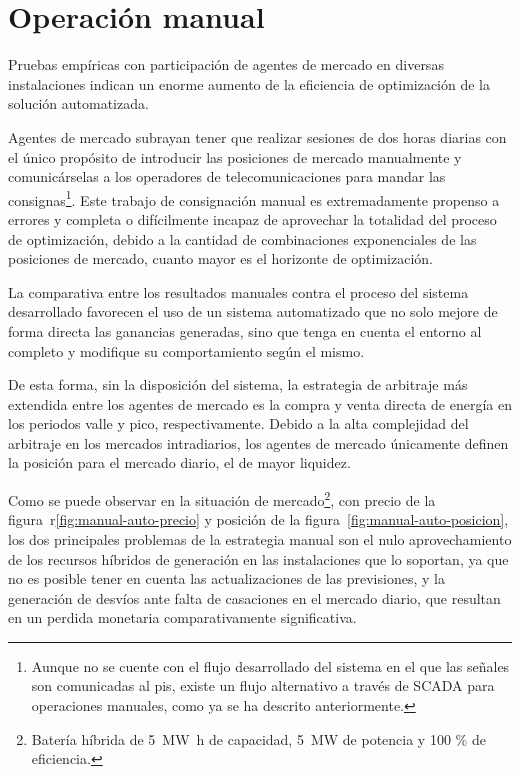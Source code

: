 \section{Operación manual}
\label{makereference7.2}

Pruebas empíricas con participación de agentes de mercado en diversas instalaciones indican un enorme aumento de la eficiencia de optimización de la solución automatizada.

Agentes de mercado subrayan tener que realizar sesiones de dos horas diarias con el único propósito de introducir las posiciones de mercado manualmente y comunicárselas a los operadores de telecomunicaciones para mandar las consignas\footnote{Aunque no se cuente con el flujo desarrollado del sistema en el que las señales son comunicadas al \gls{pis}, existe un flujo alternativo a través de SCADA para operaciones manuales, como ya se ha descrito anteriormente.}. Este trabajo de consignación manual es extremadamente propenso a errores y completa o difícilmente incapaz de aprovechar la totalidad del proceso de optimización, debido a la cantidad de combinaciones exponenciales de las posiciones de mercado, cuanto mayor es el horizonte de optimización.

La comparativa entre los resultados manuales contra el proceso del sistema desarrollado favorecen el uso de un sistema automatizado que no solo mejore de forma directa las ganancias generadas, sino que tenga en cuenta el entorno al completo y modifique su comportamiento según el mismo.

De esta forma, sin la disposición del sistema, la estrategia de arbitraje más extendida entre los agentes de mercado es la compra y venta directa de energía en los periodos valle y pico, respectivamente. Debido a la alta complejidad del arbitraje en los mercados intradiarios, los agentes de mercado únicamente definen la posición para el mercado diario, el de mayor liquidez.

Como se puede observar en la situación de mercado\footnote{Batería híbrida de \SI{5}{{\mega\watt\hour}} de capacidad, \SI{5}{{\mega\watt}} de potencia y 100 \% de eficiencia.}, con precio de la figura~r\ref{fig:manual-auto-precio} y posición de la figura~\ref{fig:manual-auto-posicion}, los dos principales problemas de la estrategia manual son el nulo aprovechamiento de los recursos híbridos de generación en las instalaciones que lo soportan, ya que no es posible tener en cuenta las actualizaciones de las previsiones, y la generación de desvíos ante falta de casaciones en el mercado diario, que resultan en un perdida monetaria comparativamente significativa.

